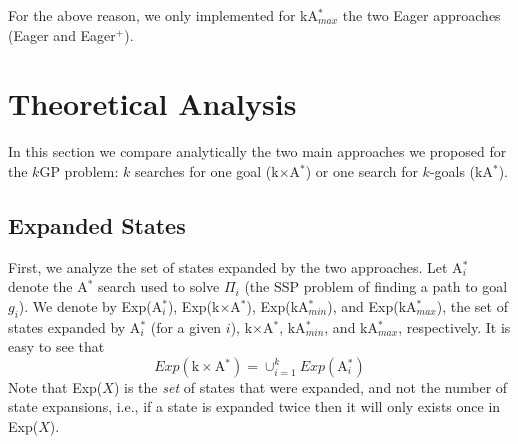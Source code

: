 \documentclass{aicom2e}
\newcommand{\kgs}{$k$GP}
\newcommand{\astar}{A$^*$}
\newcommand{\kastar}{kA$^*$}
\newcommand{\kastarmin}{kA$^*_{min}$}
\newcommand{\kastarmax}{kA$^*_{max}$}
\newcommand{\kxastar}{k$\times$A$^*$}
\newcommand{\astari}[1]{A$^*_#1$}
\newcommand{\open}{\textsc{Open}}
\begin{document}
For the above reason, we only implemented for \kastarmax{} the two Eager approaches (Eager and Eager$^+$).



\section{Theoretical Analysis}
\label{sec:theoretical-analysis}

In this section we compare analytically the two main approaches we proposed for
the \kgs{} problem: $k$ searches for one goal (\kxastar{}) or one search for
$k$-goals (\kastar{}).

\subsection{Expanded States}
\label{sec:expandedStates}
First, we analyze the set of states expanded by the two approaches.
Let \astari{i} denote   the \astar{} search used to solve $\Pi_i$ (the SSP problem of finding a path to goal $g_i$).
We denote by Exp(\astari{i}), Exp(\kxastar{}), Exp(\kastarmin), and Exp(\kastarmax),
the set of states expanded by \astari{i} (for a given $i$), \kxastar{}, \kastarmin, and \kastarmax{}, respectively.
It is easy to see that
\[ Exp(\text{\kxastar{}})=\cup_{i=1}^k Exp(\text{\astari{i}}) \]
Note that Exp($X$) is the {\em set} of states that were expanded, and not the number of state expansions, i.e., if a state is expanded twice then it will only exists once in Exp($X$).
\end{document}
